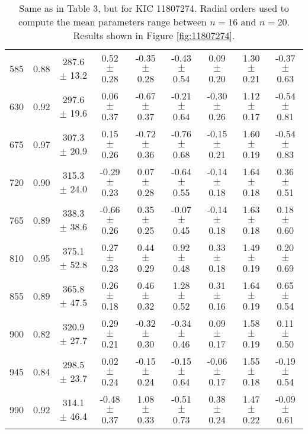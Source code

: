 \documentclass[twocolumn]{aastex61}%
\begin{document}
\begin{table*}[ht]
\begin{tabular}{ccc|ccccc|c}
585 & 0.88 & 287.6 $\pm$ 13.2 & 0.52 $\pm$ 0.28 & -0.35 $\pm$ 0.28 & -0.43 $\pm$ 0.54 & 0.09 $\pm$ 0.20 & 1.30 $\pm$ 0.21 & -0.37 $\pm$ 0.63\\
630 & 0.92 & 297.6 $\pm$ 19.6 & 0.06 $\pm$ 0.37 & -0.67 $\pm$ 0.37 & -0.21 $\pm$ 0.64 & -0.30 $\pm$ 0.26 & 1.12 $\pm$ 0.17 & -0.54 $\pm$ 0.81\\
675 & 0.97 & 307.3 $\pm$ 20.9 & 0.15 $\pm$ 0.26 & -0.72 $\pm$ 0.36 & -0.76 $\pm$ 0.68 & -0.15 $\pm$ 0.21 & 1.60 $\pm$ 0.19 & -0.54 $\pm$ 0.83\\
720 & 0.90 & 315.3 $\pm$ 24.0 & -0.29 $\pm$ 0.23 & 0.07 $\pm$ 0.28 & -0.64 $\pm$ 0.55 & -0.14 $\pm$ 0.18 & 1.64 $\pm$ 0.18 & 0.36 $\pm$ 0.51\\
765 & 0.89 & 338.3 $\pm$ 38.6 & -0.66 $\pm$ 0.26 & 0.35 $\pm$ 0.25 & -0.07 $\pm$ 0.45 & -0.14 $\pm$ 0.18 & 1.63 $\pm$ 0.18 & 0.18 $\pm$ 0.60\\
810 & 0.95 & 375.1 $\pm$ 52.8 & 0.27 $\pm$ 0.23 & 0.44 $\pm$ 0.29 & 0.92 $\pm$ 0.48 & 0.33 $\pm$ 0.18 & 1.49 $\pm$ 0.19 & 0.20 $\pm$ 0.69\\
855 & 0.89 & 365.8 $\pm$ 47.5 & 0.26 $\pm$ 0.18 & 0.46 $\pm$ 0.32 & 1.28 $\pm$ 0.52 & 0.31 $\pm$ 0.16 & 1.64 $\pm$ 0.19 & 0.65 $\pm$ 0.54\\
900 & 0.82 & 320.9 $\pm$ 27.7 & 0.29 $\pm$ 0.21 & -0.32 $\pm$ 0.30 & -0.34 $\pm$ 0.46 & 0.09 $\pm$ 0.17 & 1.58 $\pm$ 0.19 & 0.11 $\pm$ 0.50\\
945 & 0.84 & 298.5 $\pm$ 23.7 & 0.02 $\pm$ 0.24 & -0.15 $\pm$ 0.24 & -0.15 $\pm$ 0.64 & -0.06 $\pm$ 0.17 & 1.55 $\pm$ 0.18 & -0.19 $\pm$ 0.54\\
990 & 0.92 & 314.1 $\pm$ 46.4 & -0.48 $\pm$ 0.37 & 1.08 $\pm$ 0.33 & -0.51 $\pm$ 0.73 & 0.38 $\pm$ 0.24 & 1.47 $\pm$ 0.22 & -0.09 $\pm$ 0.61\\
\end{tabular}
\caption{Same as in Table 3, but for KIC 11807274. Radial orders used to compute the mean parameters range between $n=16$ and $n=20$. Results shown in Figure \ref{fig:11807274}.}\label{tab:11807274}\vspace{-1.5cm}
\end{table*}
\end{document}
